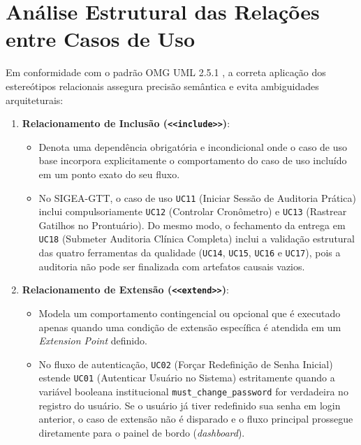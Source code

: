 \section{Análise Estrutural das Relações entre Casos de Uso}
\label{sec_analise_relacoes}

Em conformidade com o padrão OMG UML 2.5.1 \cite{omg2017}, a correta aplicação dos estereótipos relacionais assegura precisão semântica e evita ambiguidades arquiteturais:

\begin{enumerate}
    \item \textbf{Relacionamento de Inclusão (\texttt{<<include>>})}:
    \begin{itemize}
        \item Denota uma dependência obrigatória e incondicional onde o caso de uso base incorpora explicitamente o comportamento do caso de uso incluído em um ponto exato do seu fluxo.
        \item No SIGEA-GTT, o caso de uso \texttt{UC11} (Iniciar Sessão de Auditoria Prática) inclui compulsoriamente \texttt{UC12} (Controlar Cronômetro) e \texttt{UC13} (Rastrear Gatilhos no Prontuário). Do mesmo modo, o fechamento da entrega em \texttt{UC18} (Submeter Auditoria Clínica Completa) inclui a validação estrutural das quatro ferramentas da qualidade (\texttt{UC14}, \texttt{UC15}, \texttt{UC16} e \texttt{UC17}), pois a auditoria não pode ser finalizada com artefatos causais vazios.
    \end{itemize}

    \item \textbf{Relacionamento de Extensão (\texttt{<<extend>>})}:
    \begin{itemize}
        \item Modela um comportamento contingencial ou opcional que é executado apenas quando uma condição de extensão específica é atendida em um \textit{Extension Point} definido.
        \item No fluxo de autenticação, \texttt{UC02} (Forçar Redefinição de Senha Inicial) estende \texttt{UC01} (Autenticar Usuário no Sistema) estritamente quando a variável booleana institucional \texttt{must\_change\_password} for verdadeira no registro do usuário. Se o usuário já tiver redefinido sua senha em login anterior, o caso de extensão não é disparado e o fluxo principal prossegue diretamente para o painel de bordo (\textit{dashboard}).
    \end{itemize}


\end{enumerate}
